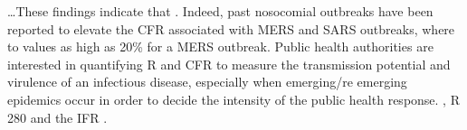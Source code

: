 \begin{refsection}
\begin{tcolorbox}[quote]
\end{tcolorbox}

\begin{tcolorbox}[quote]

\dots{}These findings indicate that . Indeed, past nosocomial outbreaks have been reported to elevate the CFR associated with MERS and SARS outbreaks, where  to values as high as 20\% for a MERS outbreak. Public health authorities are interested in quantifying R and CFR to measure the transmission potential and virulence of an infectious disease, especially when emerging/re emerging epidemics occur in order to decide the intensity of the public health response. , R  280 and the IFR .\textsuperscript{\cite{url9188f03b}}

\end{tcolorbox}

\printbibliography[heading=subbibliography]

\end{refsection}